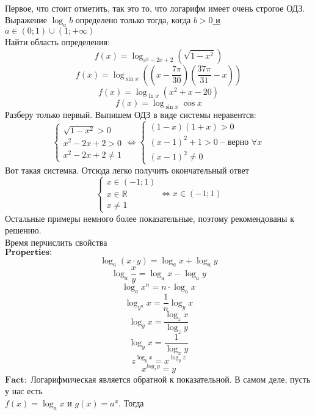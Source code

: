 \documentclass{article}
\begin{document}
\paragraph{}
Первое, что стоит отметить, так это то, что логарифм имеет очень строгое ОДЗ. Выражение  \( \log_a b\) определено
только тогда, когда \underline{\( b > 0 \) и \( a \in (0; 1) \cup (1;+\infty) \)} \\
Найти область определения: \\
\[ f(x) = \log_{x^2 - 2x + 2} (\sqrt{1 - x^2})\]
\[ f(x) = \log_{\sin x} \left((x - \frac{7\pi}{30})(\frac{37\pi}{31} - x)\right)\]
\[ f(x) = \log_{\ln x} (x^2 + x - 20)\]
\[ f(x) = \log_{\sin x} \cos x\]
Разберу только первый. Выпишем ОДЗ в виде системы неравентсв: 
\begin{equation*}
    \begin{cases}
    \sqrt{1 - x^2} > 0 \\
    x^2 - 2x + 2 > 0 \\
    x^2 - 2x + 2 \neq 1
    \end{cases}
    \Leftrightarrow
    \begin{cases}
    (1 - x)(1 + x) > 0\\
    (x - 1)^2 + 1 > 0 \text{ -- верно } \forall x \\
    (x - 1)^2 \neq 0
    \end{cases}
\end{equation*}
Вот такая системка. Отсюда легко получить окончательный ответ
\begin{equation*}
    \begin{cases}
    x \in (-1; 1) \\
    x \in \mathbb{R}\\
    x \neq 1
    \end{cases}
    \Leftrightarrow
    x \in (-1; 1)
\end{equation*}
Остальные примеры немного более показательные, поэтому рекомендованы к решению. \\
\newpage
Время перчислить свойства \\
\(\mathbf{Properties:}\)
\[ \log_a (x \cdot y) = \log_a x + \log_a y \]
\[ \log_a \frac{x}{y} = \log_a x - \log_a y \]
\[ \log_a x^n = n \cdot \log_a x \]
\[ \log_{y^n} x = \frac{1}{n} \log_y x \] 
\[ \log_y x = \frac{\log_z x}{\log_z y} \]
\[ \log_y x = \frac{1}{\log_x y} \]
\[ z^{\log_y x} = x^{\log_y z} \]
\[ x^{log_x y} = y \]
\(\mathbf{Fact:}\) Логарифмическая является обратной к показательной.
В самом деле, пусть у нас есть \\ \( f(x) = \log_a x \text{ и } g(x) = a^x \). Тогда 
\end{document}
